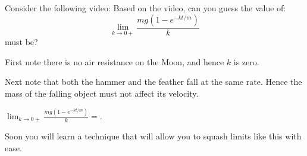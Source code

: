 \documentclass{ximera}
\begin{document}




 
\begin{problem}
Consider the following video: 
Based on the video, can you guess the value of:
\[
\lim_{k\to 0+} \frac{mg(1-e^{-kt/m})}{k}
\]
must be?
\begin{hint}
First note there is no air resistance on the Moon, and hence $k$ is
zero.
\end{hint}
\begin{hint}
Next note that both the hammer and the feather fall at the same rate.
Hence the mass of the falling object must not affect its velocity.
\end{hint}
\begin{prompt}
$\lim_{k\to 0+}\frac{mg(1-e^{-kt/m})}{k} = $.
\end{prompt}
\end{problem}

Soon you will learn a technique that will allow you to squash limits
like this with ease.
\end{document}
